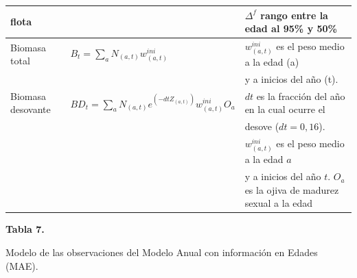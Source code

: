 \documentclass[
  spanish,
]{article}
\begin{document}
\begin{table}[h]
{\begin{tabular}{|l|l|l|}
flota                &                                                                     & $\Delta^f$ rango entre la edad al 95\% y 50\% \\ \hline
Biomasa total        & $B_t=\sum_a N_{(a,t)} w_{(a,t)}^{ini}$                              & $w_{(a,t)}^{ini}$ es el peso medio a la edad (a) \\
                     &                                                                     & y a inicios del año (t).\\ \hline
Biomasa desovante    & $BD_t=\sum_aN_{(a,t)} e^{(-dtZ_{(a,t)})} w_{(a,t)}^{ini}O_a$        & $dt$ es la fracción del año en la cual ocurre el \\
                     &                                                                     & desove ($dt =0,16$). \\
                     &                                                                     & $w_{(a,t)}^{ini}$ es el peso medio a la edad $a$ \\
                     &                                                                     & y a inicios del año $t$. $O_a$ es la ojiva de madurez sexual a la edad \\ \hline
  \end{tabular}}
        \end{table}

\pagebreak

\small
\begin{center} 
\textbf{Tabla 7.}
\end{center}
\begin{center} 
\vspace{-0.2cm} Modelo de las observaciones del Modelo Anual con información en Edades (MAE).
\end{center}
\vspace{-0.2cm}
\end{document}
